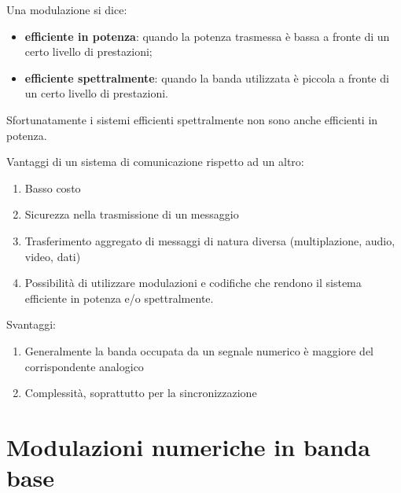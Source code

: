 \documentclass{article}
\begin{document}
Una modulazione si dice:
\begin{itemize}
\item \textbf{efficiente in potenza}: quando la potenza trasmessa è bassa a fronte di un certo livello di prestazioni;
\item \textbf{efficiente spettralmente}: quando la banda utilizzata è piccola a fronte di un certo livello di prestazioni.
\end{itemize}

Sfortunatamente i sistemi efficienti spettralmente non sono anche efficienti in potenza.

Vantaggi di un sistema di comunicazione rispetto ad un altro:
\begin{enumerate}
\item Basso costo
\item Sicurezza nella trasmissione di un messaggio
\item Trasferimento aggregato di messaggi di natura diversa (multiplazione, audio, video, dati)
\item Possibilità di utilizzare modulazioni e codifiche che rendono il sistema efficiente in potenza e/o spettralmente.
\end{enumerate}

Svantaggi:
\begin{enumerate}
\item Generalmente la banda occupata da un segnale numerico è maggiore del corrispondente analogico
\item Complessità, soprattutto per la sincronizzazione
\end{enumerate}

\section*{Modulazioni numeriche in banda base}
\end{document}
